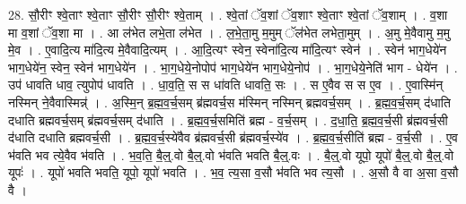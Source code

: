 \documentclass[17pt]{extarticle}
\begin{document}
28. सौ॒रीꣳ श्वे॒ताꣳ श्वे॒ताꣳ सौ॒रीꣳ सौ॒रीꣳ श्वे॒ताम् । . श्वे॒तां ॅव॒शां ॅव॒शाꣳ श्वे॒ताꣳ श्वे॒तां ॅव॒शाम् । . व॒शा मा व॒शां ॅव॒शा मा । . आ ल॑भेत लभे॒ता ल॑भेत । . ल॒भे॒ता॒मु म॒मुम् ॅल॑भेत लभेता॒मुम् । . अ॒मु मे॒वैवामु म॒मु मे॒व । . ए॒वादि॒त्य मा॑दि॒त्य मे॒वैवादि॒त्यम् । . आ॒दि॒त्यꣳ स्वेन॒ स्वेना॑दि॒त्य मा॑दि॒त्यꣳ स्वेन॑ । . स्वेन॑ भाग॒धेये॑न भाग॒धेये॑न॒ स्वेन॒ स्वेन॑ भाग॒धेये॑न । . भा॒ग॒धेये॒नोपोप॑ भाग॒धेये॑न भाग॒धेये॒नोप॑ । . भा॒ग॒धेये॒नेति॑ भाग - धेये॑न । . उप॑ धावति धाव॒ त्युपोप॑ धावति । . धा॒व॒ति॒ स स धा॑वति धावति॒ सः । . स ए॒वैव स स ए॒व । . ए॒वास्मि॑न् नस्मिन् ने॒वैवास्मिन्न्॑ । . अ॒स्मि॒न् ब्र॒ह्म॒व॒र्च॒सम् ब्र॑ह्मवर्च॒स म॑स्मिन् नस्मिन् ब्रह्मवर्च॒सम् । . ब्र॒ह्म॒व॒र्च॒सम् द॑धाति दधाति ब्रह्मवर्च॒सम् ब्र॑ह्मवर्च॒सम् द॑धाति । . ब्र॒ह्म॒व॒र्च॒समिति॑ ब्रह्म - व॒र्च॒सम् । . द॒धा॒ति॒ ब्र॒ह्म॒व॒र्च॒सी ब्र॑ह्मवर्च॒सी द॑धाति दधाति ब्रह्मवर्च॒सी । . ब्र॒ह्म॒व॒र्च॒स्ये॑वैव ब्र॑ह्मवर्च॒सी ब्र॑ह्मवर्च॒स्ये॑व । . ब्र॒ह्म॒व॒र्च॒सीति॑ ब्रह्म - व॒र्च॒सी । . ए॒व भ॑वति भव त्ये॒वैव भ॑वति । . भ॒व॒ति॒ बै॒ल्॒.वो बै॒ल्॒.वो भ॑वति भवति बै॒ल्॒.वः । . बै॒ल्॒.वो यूपो॒ यूपो॑ बै॒ल्॒.वो बै॒ल्॒.वो यूपः॑ । . यूपो॑ भवति भवति॒ यूपो॒ यूपो॑ भवति । . भ॒व॒ त्य॒सा व॒सौ भ॑वति भव त्य॒सौ । . अ॒सौ वै वा अ॒सा व॒सौ वै । \newline
\end{document}

